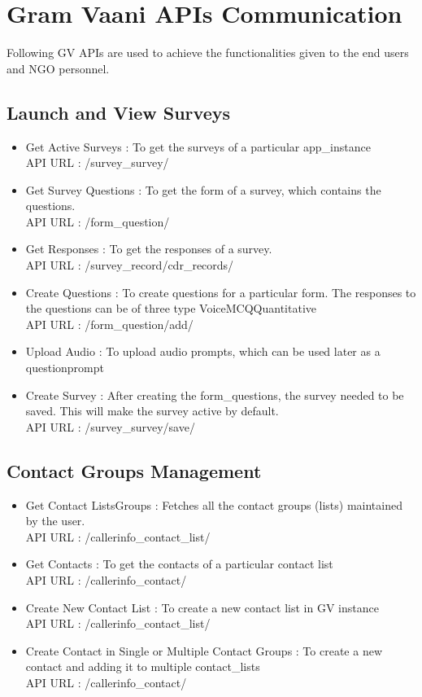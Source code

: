 \chapter{Gram Vaani APIs Communication}
Following GV APIs are used to achieve the functionalities given to the end users and NGO personnel.
 
\section{Launch and View Surveys}
\begin{itemize}
\item Get Active Surveys : To get the surveys of a particular app\_instance
\ \\
API URL : /survey\_survey/
\item Get Survey Questions : To get the form of a survey, which contains the questions.
\ \\
API URL : /form\_question/

\item Get Responses : To get the responses of a survey.
\ \\
API URL : /survey\_record/cdr\_records/

\item Create Questions : To create questions for a particular form. The responses to the questions can be of three type Voice\/MCQ\/Quantitative
\ \\
API URL : /form\_question/add/
\item Upload Audio : To upload audio prompts, which can be used later as a question\/prompt
\item Create Survey : After creating the form\_questions, the survey needed to be saved. This will make the survey active by default.
\  \\
API URL : /survey\_survey/save/

\end{itemize}

\section{Contact Groups Management}
\begin{itemize}
\item Get Contact Lists\/Groups : Fetches all the contact groups (lists) maintained by the user.
\ \\
API URL : /callerinfo\_contact\_list/

\item Get Contacts : To get the contacts of a particular contact list
\ \\
API URL : /callerinfo\_contact/
\item Create New Contact List : To create a new contact list in GV instance
\ \\
API URL : /callerinfo\_contact\_list/
\item Create Contact in Single or Multiple Contact Groups : To create a new contact and adding it to multiple contact\_lists
\ \\
API URL : /callerinfo\_contact/
\end{itemize}


